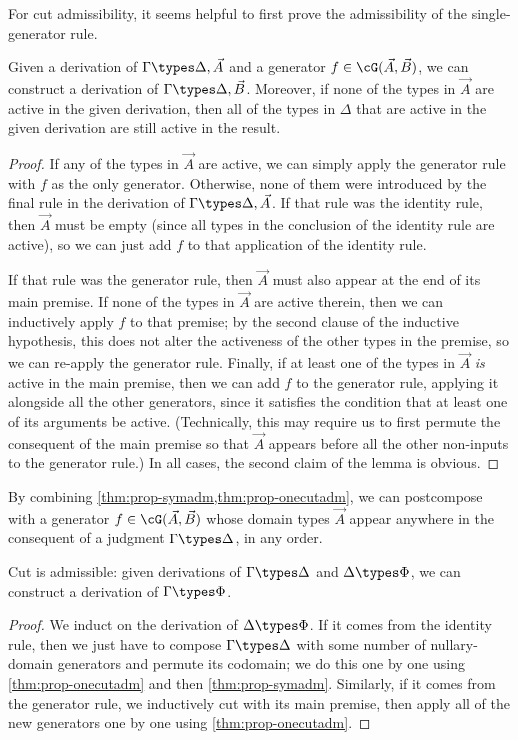 For cut admissibility, it seems helpful to first prove the admissibility of the single-generator rule.

\begin{lem}\label{thm:prop-onecutadm}
  Given a derivation of $\Gamma\types \Delta,\vec A$ and a generator $f\in \cG(\vec A,\vec B)$, we can construct a derivation of $\Gamma\types \Delta,\vec B$.
  Moreover, if none of the types in $\vec A$ are active in the given derivation, then all of the types in $\Delta$ that are active in the given derivation are still active in the result.
\end{lem}
\begin{proof}
  If any of the types in $\vec A$ are active, we can simply apply the generator rule with $f$ as the only generator.
  Otherwise, none of them were introduced by the final rule in the derivation of $\Gamma\types \Delta,\vec A$.
  If that rule was the identity rule, then $\vec A$ must be empty (since all types in the conclusion of the identity rule are active), so we can just add $f$ to that application of the identity rule.

  If that rule was the generator rule, then $\vec A$ must also appear at the end of its main premise.
  If none of the types in $\vec A$ are active therein, then we can inductively apply $f$ to that premise; by the second clause of the inductive hypothesis, this does not alter the activeness of the other types in the premise, so we can re-apply the generator rule.
  Finally, if at least one of the types in $\vec A$ \emph{is} active in the main premise, then we can add $f$ to the generator rule, applying it alongside all the other generators, since it satisfies the condition that at least one of its arguments be active.
  (Technically, this may require us to first permute the consequent of the main premise so that $\vec A$ appears before all the other non-inputs to the generator rule.)
  In all cases, the second claim of the lemma is obvious.
\end{proof}

By combining \cref{thm:prop-symadm,thm:prop-onecutadm}, we can postcompose with a generator $f\in \cG(\vec A,\vec B)$ whose domain types $\vec A$ appear anywhere in the consequent of a judgment $\Gamma\types\Delta$, in any order.

\begin{thm}\label{thm:prop-cutadm}
  Cut is admissible: given derivations of $\Gamma\types \Delta$ and $\Delta \types \Phi$, we can construct a derivation of $\Gamma\types \Phi$.
\end{thm}
\begin{proof}
  We induct on the derivation of $\Delta \types \Phi$.
  If it comes from the identity rule, then we just have to compose $\Gamma\types \Delta$ with some number of nullary-domain generators and permute its codomain; we do this one by one using \cref{thm:prop-onecutadm} and then \cref{thm:prop-symadm}.
  Similarly, if it comes from the generator rule, we inductively cut with its main premise, then apply all of the new generators one by one using \cref{thm:prop-onecutadm}.
\end{proof}

